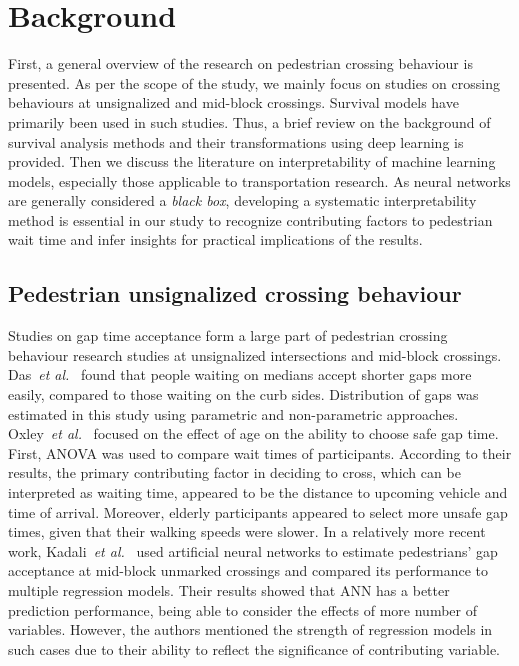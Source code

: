 \section{Background}
\label{S:lit}
First, a general overview of the research on pedestrian crossing behaviour is presented. As per the scope of the study, we mainly focus on studies on crossing behaviours at unsignalized and mid-block crossings. Survival models have primarily been used in such studies. Thus, a brief review on the background of survival analysis methods and their transformations using deep learning is provided. Then we discuss the literature on interpretability of machine learning models, especially those applicable to transportation research. As neural networks are generally considered a \textit{black box}, developing a systematic interpretability method is essential in our study to recognize contributing factors to pedestrian wait time and infer insights for practical implications of the results. 
\subsection{Pedestrian unsignalized crossing behaviour}
Studies on gap time acceptance form a large part of pedestrian crossing behaviour research studies at unsignalized intersections and mid-block crossings. Das~\textit{et al.}~\cite{das2005walk} found that people waiting on medians accept shorter gaps more easily, compared to those waiting on the curb sides. Distribution of gaps was estimated in this study using parametric and non-parametric approaches. Oxley~\textit{et al.}~\cite{oxley2005crossing} focused on the effect of age on the ability to choose safe gap time. First, ANOVA was used to compare wait times of participants. According to their results, the primary contributing factor in deciding to cross, which can be interpreted as waiting time, appeared to be the distance to upcoming vehicle and time of arrival. Moreover, elderly participants appeared to select more unsafe gap times, given that their walking speeds were slower. In a relatively more recent work, Kadali~\textit{et al.}~\cite{kadali2014evaluation} used artificial neural networks to estimate pedestrians' gap acceptance at mid-block unmarked crossings and compared its performance to multiple regression models. Their results showed that ANN has a better prediction performance, being able to consider the effects of more number of variables. However, the authors mentioned the strength of regression models in such cases due to their ability to reflect the significance of contributing variable.

